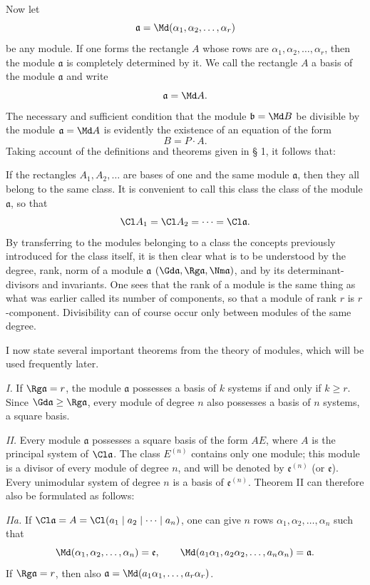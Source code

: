 Now let
\[
 \mathfrak a=\Md(\alpha_1,\alpha_2,\ldots,\alpha_r)
\]
be any module. If one forms the rectangle $A$ whose rows are $\alpha_1,\alpha_2,\ldots,\alpha_r$, then the module $\mathfrak a$ is completely determined by it. We call the rectangle $A$ a basis of the module $\mathfrak a$ and write
\[
 \mathfrak a=\Md A.
\]
The necessary and sufficient condition that the module $\mathfrak b=\Md B$ be divisible by the module $\mathfrak a=\Md A$ is evidently the existence of an equation of the form
\[
 B=P\cdot A.
\]
Taking account of the definitions and theorems given in § 1, it follows that:

If the rectangles $A_1,A_2,\ldots$ are bases of one and the same module $\mathfrak a$, then they all belong to the same class. It is convenient to call this class the class of the module $\mathfrak a$, so that
\[
 \Cl A_1=\Cl A_2=\cdots=\Cl\mathfrak a.
\]
By transferring to the modules belonging to a class the concepts previously introduced for the class itself, it is then clear what is to be understood by the degree, rank, norm of a module $\mathfrak a$ $(\Gd\mathfrak a,\Rg\mathfrak a,\Nm\mathfrak a)$, and by its determinant-divisors and invariants. One sees that the rank of a module is the same thing as what was earlier called its number of components, so that a module of rank $r$ is $r$-component. Divisibility can of course occur only between modules of the same degree.

I now state several important theorems from the theory of modules, which will be used frequently later.

\emph{I.} If $\Rg\mathfrak a=r$, the module $\mathfrak a$ possesses a basis of $k$ systems if and only if $k\ge r$. Since $\Gd\mathfrak a\ge\Rg\mathfrak a$, every module of degree $n$ also possesses a basis of $n$ systems, a square basis.

\emph{II.} Every module $\mathfrak a$ possesses a square basis of the form $AE$, where $A$ is the principal system of $\Cl\mathfrak a$. The class $E^{(n)}$ contains only one module; this module is a divisor of every module of degree $n$, and will be denoted by $\mathfrak e^{(n)}$ (or $\mathfrak e$). Every unimodular system of degree $n$ is a basis of $\mathfrak e^{(n)}$. Theorem II can therefore also be formulated as follows:

\emph{IIa.} If $\Cl\mathfrak a=A=\Cl(a_1\mid a_2\mid\cdots\mid a_n)$, one can give $n$ rows $\alpha_1,\alpha_2,\ldots,\alpha_n$ such that
\[
 \Md(\alpha_1,\alpha_2,\ldots,\alpha_n)=\mathfrak e,
 \qquad
 \Md(a_1\alpha_1,a_2\alpha_2,\ldots,a_n\alpha_n)=\mathfrak a.
\]
If $\Rg\mathfrak a=r$, then also $\mathfrak a=\Md(a_1\alpha_1,\ldots,a_r\alpha_r)$.


